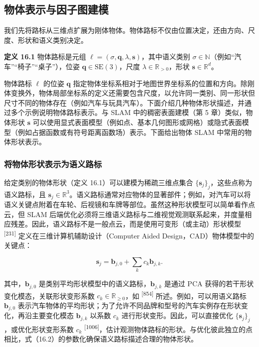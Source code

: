 \subsection{物体表示与因子图建模}

我们先将路标从三维点扩展为刚体物体。物体路标不仅由位置决定，还由方向、尺度、形状和语义类别决定。

\textbf{定义 16.1} 物体路标是元组 $\boldsymbol{\ell}=(\sigma,\boldsymbol{q},\lambda,\boldsymbol{s})$，其中语义类别 $\sigma\in\mathbb{N}$（例如“汽车”“椅子”“桌子”），位姿 $\boldsymbol{q}\in\mathrm{SE}(3)$，尺度 $\lambda\in\mathbb{R}_{>0}$，形状 $\boldsymbol{s}\in\mathbb{R}^{d}$。

物体路标 $\boldsymbol{\ell}$ 的位姿 $\boldsymbol{q}$ 指定物体坐标系相对于地图世界坐标系的位置和方向。除刚体变换外，物体局部坐标系的定义还需要包含尺度，以允许同一类别、同一形状但尺寸不同的物体存在（例如汽车与玩具汽车）。下面介绍几种物体形状描述，并通过多个示例说明物体路标表示。与 SLAM 中的稠密表面建模（第 5 章）类似，物体形状 $\boldsymbol{s}$ 可以使用显式表面模型（例如点、基本几何图形或网格）或隐式表面模型（例如占据函数或有符号距离函数场）表示。下面给出物体 SLAM 中常用的物体形状表示。

\subsubsection{将物体形状表示为语义路标}

给定类别的物体形状（定义 16.1）可以建模为稀疏三维点集合 $\{\boldsymbol{s}_j\}_j$，这些点称为语义路标，且 $\boldsymbol{s}_j\in\mathbb{R}^3$。语义路标通常对应物体的显著部件；例如，对汽车可以将语义关键点附着在车轮、后视镜和车牌等部位。虽然这种形状模型可以简单看作点云，但 SLAM 后端优化必须将三维语义路标与二维视觉观测联系起来，并度量相应残差。因此，语义路标不是一般点云，而是使用可变形（或主动）形状模型 \textsuperscript{[231]} 定义在三维计算机辅助设计（Computer Aided Design，CAD）物体模型中的关键点：

\begin{equation}
\boldsymbol{s}_j=\boldsymbol{b}_{j,0}+\sum_k c_k\boldsymbol{b}_{j,k}.\tag{16.2}
\end{equation}

其中，$\boldsymbol{b}_{j,0}$ 是类别平均形状模型中的语义路标，$\boldsymbol{b}_{j,k}$ 是通过 PCA 获得的若干形状变化模态，关联形状变形系数 $c_k\in\mathbb{R}_{\geq0}$，如 \textsuperscript{[854]} 所述。例如，可以用语义路标 $\boldsymbol{b}_{j,0}$ 表示汽车物体的平均形状；为了允许不同品牌和型号的汽车实例存在形状变化，再沿主要变化模态 $\boldsymbol{b}_{j,k}$ 以系数 $c_k$ 进行形状变形。因此，可以直接优化 $\{\boldsymbol{s}_j\}_j$，或优化形状变形系数 $c_k$ \textsuperscript{[1006]}，估计观测物体路标的形状。与优化彼此独立的点相比，式（16.2）的参数化确保语义路标描述合理的物体形状。

